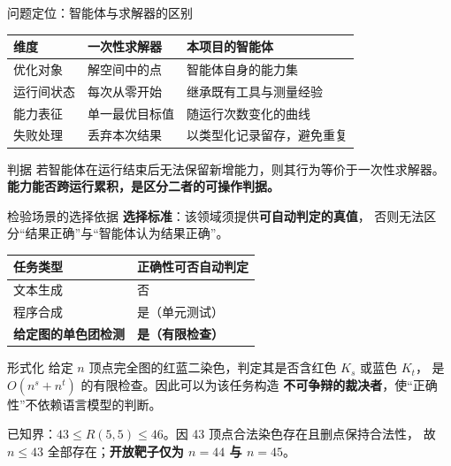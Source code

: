 \documentclass[aspectratio=169,11pt]{beamer}
\begin{document}
\begin{frame}{问题定位：智能体与求解器的区别}
  \begin{center}
  \small
  \begin{tabular}{@{}p{}p{}p{}@{}}
    \toprule
    \textbf{维度} & \textbf{一次性求解器} & \textbf{本项目的智能体} \\
    \midrule
    优化对象 & 解空间中的点 & 智能体自身的能力集 \\
    运行间状态 & 每次从零开始 & 继承既有工具与测量经验 \\
    能力表征 & 单一最优目标值 & 随运行次数变化的曲线 \\
    失败处理 & 丢弃本次结果 & 以类型化记录留存，避免重复 \\
    \bottomrule
  \end{tabular}
  \end{center}

  \vspace{0.8em}
  \begin{alertblock}{判据}
    若智能体在运行结束后无法保留新增能力，则其行为等价于一次性求解器。
    \textbf{能力能否跨运行累积，是区分二者的可操作判据。}
  \end{alertblock}
\end{frame}

\begin{frame}{检验场景的选择依据}
  \textbf{选择标准}：该领域须提供\textbf{可自动判定的真值}，
  否则无法区分“结果正确”与“智能体认为结果正确”。

  \vspace{0.5em}
  \begin{center}
  \small
  \begin{tabular}{@{}ll@{}}
    \toprule
    任务类型 & 正确性可否自动判定 \\
    \midrule
    文本生成 & 否 \\
    程序合成 & 是（单元测试） \\
    \textbf{给定图的单色团检测} & \textbf{是（有限检查）} \\
    \bottomrule
  \end{tabular}
  \end{center}

  \vspace{0.6em}
  \begin{block}{形式化}
    给定 $n$ 顶点完全图的红蓝二染色，判定其是否含红色 $K_s$ 或蓝色 $K_t$，
    是 $O(n^{s}+n^{t})$ 的有限检查。因此可以为该任务构造
    \textbf{不可争辩的裁决者}，使“正确性”不依赖语言模型的判断。
  \end{block}

  \vspace{0.4em}
  \footnotesize\color{black!70}
  已知界：$43 \le R(5,5) \le 46$。因 43 顶点合法染色存在且删点保持合法性，
  故 $n \le 43$ 全部存在；\textbf{开放靶子仅为 $n=44$ 与 $n=45$}。
\end{frame}
\end{document}
